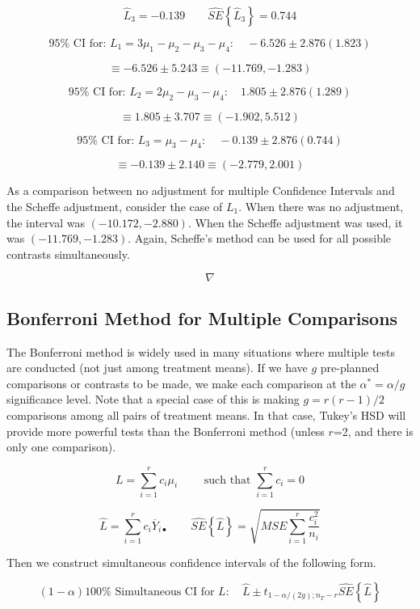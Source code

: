 \documentclass[
]{book}
\begin{document}
\[
\hat{L}_3=-0.139 \qquad \hat{SE}\left\{\hat{L}_3\right\}=0.744 
\]

\[
95\% \mbox{ CI for: }L_1=3\mu_1-\mu_2-\mu_3-\mu_4:
\quad -6.526 \pm 2.876(1.823)
\]

\[
\equiv -6.526\pm 5.243 \equiv
(-11.769,-1.283)
\]

\[
95\% \mbox{ CI for: }L_2=2\mu_2-\mu_3-\mu_4:
\quad 1.805 \pm 2.876(1.289)
\]

\[
\equiv 1.805\pm 3.707 \equiv
(-1.902,5.512)
\]

\[
95\% \mbox{ CI for: }L_3=\mu_3-\mu_4:
\quad -0.139 \pm 2.876(0.744)
\]

\[
\equiv -0.139\pm 2.140 \equiv
(-2.779,2.001)
\]

As a comparison between no adjustment for multiple Confidence Intervals
and the Scheffe adjustment, consider the case of \(L_1\). When there was
no adjustment, the interval was \((-10.172,-2.880)\). When the Scheffe
adjustment was used, it was \((-11.769,-1.283)\). Again, Scheffe's
method can be used for all possible contrasts simultaneously.

\[\nabla\]

\subsection{Bonferroni Method for Multiple
Comparisons}\label{bonferroni-method-for-multiple-comparisons}

The Bonferroni method is widely used in many situations where multiple
tests are conducted (not just among treatment means). If we have \(g\)
pre-planned comparisons or contrasts to be made, we make each comparison
at the \(\alpha^*=\alpha/g\) significance level. Note that a special
case of this is making \(g=r(r-1)/2\) comparisons among all pairs of
treatment means. In that case, Tukey's HSD will provide more powerful
tests than the Bonferroni method (unless \(r\)=2, and there is only one
comparison).

\[
L=\sum_{i=1}^rc_i \mu_i \qquad \mbox{ such that } \sum_{i=1}^rc_i=0
\]

\[
\hat{L}=\sum_{i=1}^rc_i\overline{Y}_{i\bullet}  \qquad
\hat{SE}\left\{\hat{L}\right\}=\sqrt{MSE\sum_{i=1}^r\frac{c_i^2}{n_i}}
\]

Then we construct simultaneous confidence intervals of the following
form.

\[
(1-\alpha)100\% \mbox{ Simultaneous CI for }L: \quad
\hat{L} \pm t_{1-\alpha/(2g);n_T-r}
\hat{SE}\left\{\hat{L}\right\}
\]
\end{document}
